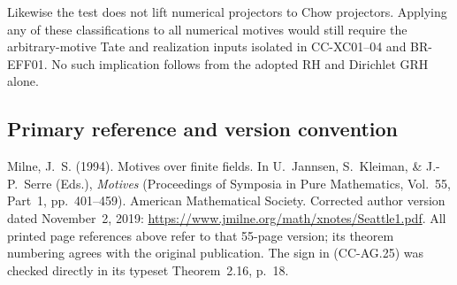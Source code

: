 Likewise the test does not lift numerical projectors to
Chow projectors.  Applying any of these classifications
to all numerical motives would still require the
arbitrary-motive Tate and realization inputs isolated in
CC-XC01--04 and BR-EFF01.  No such implication follows
from the adopted RH and Dirichlet GRH alone.

\subsection{Primary reference and version convention}

Milne, J.~S. (1994). Motives over finite fields. In
U.~Jannsen, S.~Kleiman, \& J.-P.~Serre (Eds.),
\emph{Motives} (Proceedings of Symposia in Pure Mathematics,
Vol.~55, Part~1, pp.~401--459). American Mathematical
Society. Corrected author version dated November~2, 2019:
\url{https://www.jmilne.org/math/xnotes/Seattle1.pdf}.
All printed page references above refer to that 55-page
version; its theorem numbering agrees with the original
publication.  The sign in (CC-AG.25) was checked directly
in its typeset Theorem~2.16, p.~18.
